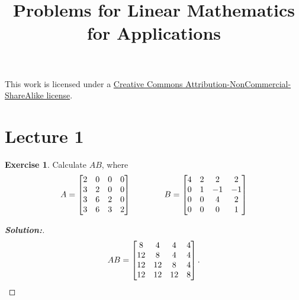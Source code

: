 \documentclass[a4paper]{amsart}
\title{Problems for Linear Mathematics for Applications}
\theoremstyle{definition}
\newtheorem{exercise}{Exercise}
\newenvironment{solution}{\begin{proof}[\textbf{Solution:}] \vphantom{u}}{\end{proof}}
\begin{document}
\maketitle

\begin{center}
 This work is licensed under a 
 \href{https://creativecommons.org/licenses/by-nc-sa/3.0/deed.en}{
  Creative Commons Attribution-NonCommercial-ShareAlike license}.
 
 \bigskip

 \doclicenseImage 
\end{center}

\newpage

\section{Lecture 1}

\begin{exercise}\label{ex-mat-prod-i}
 Calculate $AB$, where 
 \[ A = \left[\begin{matrix} 2&0&0&0 \\ 3&2&0&0 \\ 3&6&2&0 \\ 3&6&3&2 \end{matrix}\right] 
    \hspace{4em}
    B = \left[\begin{matrix} 4&2&2&2 \\ 0&1&-1&-1 \\ 0&0&4&2 \\ 0&0&0&1 \end{matrix}\right]
 \]
\end{exercise}
\begin{solution}
 \[ AB = \left[\begin{matrix}  8 &  4 &  4 &  4 \\
              12 &  8 &  4 &  4 \\
              12 & 12 &  8 &  4 \\
              12 & 12 & 12 &  8
         \end{matrix}\right] .
 \]
\end{solution}
\end{document}
